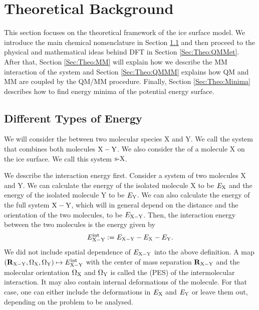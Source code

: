 \documentclass[8.5pt,twoside,twocolumn]{article}
\newcommand\eint{\enmat{E^{\te{int}}}}
\newcommand\sur{\enmat{\te{s-}}}
\theoremstyle{standard}
\begin{document}
\section{Theoretical Background}
\label{Sec:Theo}
This section focuses on the theoretical framework of the ice surface model. We introduce the main chemical
nomenclature in Section \ref{Sec:Theo:Interaction} and then proceed to the
physical and mathematical ideas behind DFT in Section \ref{Sec:Theo:QMMet}.
After that, Section \ref{Sec:Theo:MM} will explain how we describe the MM
interaction of the system and Section \ref{Sec:Theo:QMMM} explains how QM and
MM are coupled by the QM/MM procedure. Finally, Section \ref{Sec:Theo:Minima}
describes how to find energy minima of the potential energy surface.

\newcommand\X{\enmat{\te X}}
\newcommand\Y{\enmat{\te Y}}
\newcommand\Z{\enmat{\te Z}}
\newcommand\XY{{\enmat{{\X - \Y}}}}
\renewcommand\S{\enmat{\te S}}
\newcommand\sX{\enmat{{\sur\te{X}}}}
\newcommand\A{\enmat{\te A}}
\subsection{Different Types of Energy}
\label{Sec:Theo:Interaction}
We will consider the  between two molecular species X and Y. We call
the system that combines both molecules $\XY$. We also consider the
 of a molecule X on the ice surface. We call this system $\sX$.

We describe the interaction energy first.
Consider a system of two molecules X and Y. We can calculate the energy of the isolated molecule X to
be $E_{\text X}$ and the energy of the isolated molecule Y to be $E_{\text Y}$. We can also calculate the 
energy of the full system $\XY$, which will in general depend on the distance and the orientation
of the two molecules, to be $E_{\XY}$. Then, the interaction energy between the two molecules
is the energy given by
\begin{equation}
 \eint_{\XY} := E_{\XY} - E_\X - E_\Y.
 \label{Theo:InteractionEnergy}
\end{equation}
We did not include spatial dependence of $E_{\XY}$ into the above definition. A
map \mbox{$(\bo R_\XY, \Om_\X, \Om_\Y) \mapsto \eint_\XY$} with the center of
mass separation $\bo R_\XY$ and the molecular orientation $\Om_\X$ and $\Om_\Y$
is called the  (PES) of the intermolecular interaction. It may also contain internal deformations of
the molecule. For that case, one can either include the deformations in $E_\X$
and $E_\Y$ or leave them out, depending on the problem to be analysed.
\end{document}

